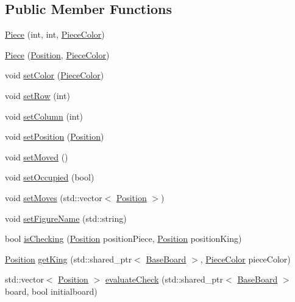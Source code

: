 \subsection*{Public Member Functions}
\begin{DoxyCompactItemize}
\item 
\hyperlink{class_piece_a1ae0a039406ce1ca4eebc4465426bf25}{Piece} (int, int, \hyperlink{_piece_8h_ad7595c48bb74c0dd2a7648712a2d4985}{Piece\+Color})
\item 
\hyperlink{class_piece_a98d2204a49a52df4cda971aa669e6796}{Piece} (\hyperlink{struct_position}{Position}, \hyperlink{_piece_8h_ad7595c48bb74c0dd2a7648712a2d4985}{Piece\+Color})
\item 
void \hyperlink{class_piece_a5b8c0f65eb850c91ae148501cd15adbf}{set\+Color} (\hyperlink{_piece_8h_ad7595c48bb74c0dd2a7648712a2d4985}{Piece\+Color})
\item 
void \hyperlink{class_piece_a604cbeae62b4358425d046bc5d737a39}{set\+Row} (int)
\item 
void \hyperlink{class_piece_a826ba56a44a5bf2e1ecdea849f2581d3}{set\+Column} (int)
\item 
void \hyperlink{class_piece_a459865f830ff8c199cfca49f5d89b806}{set\+Position} (\hyperlink{struct_position}{Position})
\item 
void \hyperlink{class_piece_a0ff1ca92370da533f6ef421dc09741f8}{set\+Moved} ()
\item 
void \hyperlink{class_piece_aad0fbfd687db57c60b5b4585b67f387d}{set\+Occupied} (bool)
\item 
void \hyperlink{class_piece_ad63e838ac5edfe8abab7211fc79e5a82}{set\+Moves} (std\+::vector$<$ \hyperlink{struct_position}{Position} $>$)
\item 
void \hyperlink{class_piece_a16971e1511ab403ede566b4fdbbab8a8}{set\+Figure\+Name} (std\+::string)
\item 
bool \hyperlink{class_piece_aa45b0c7c5552437dfd9d4567d2c7e7dd}{is\+Checking} (\hyperlink{struct_position}{Position} position\+Piece, \hyperlink{struct_position}{Position} position\+King)
\item 
\hyperlink{struct_position}{Position} \hyperlink{class_piece_a8537f9ebe9b135e3e5da99f385a90042}{get\+King} (std\+::shared\+\_\+ptr$<$ \hyperlink{class_base_board}{Base\+Board} $>$, \hyperlink{_piece_8h_ad7595c48bb74c0dd2a7648712a2d4985}{Piece\+Color} piece\+Color)
\item 
std\+::vector$<$ \hyperlink{struct_position}{Position} $>$ \hyperlink{class_piece_a9cb5fe774dcb187ce20ff18c93269e3f}{evaluate\+Check} (std\+::shared\+\_\+ptr$<$ \hyperlink{class_base_board}{Base\+Board} $>$ board, bool initialboard)

\end{DoxyCompactItemize}
